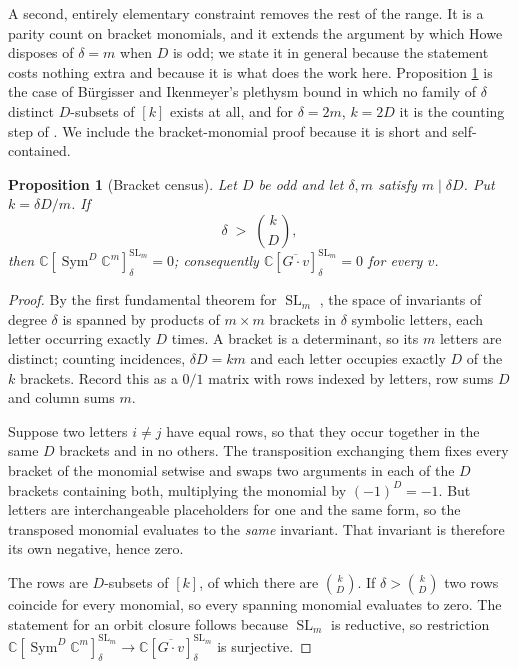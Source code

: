 \documentclass[11pt,reqno]{amsart}
\theoremstyle{plain}
\newtheorem{proposition}[theorem]{Proposition}
\theoremstyle{definition}
\DeclareMathOperator{\SL}{SL}
\DeclareMathOperator{\Sym}{Sym}
\newcommand{\bC}{\mathbb{C}}
\begin{document}
A second, entirely elementary constraint removes the rest of the range.  It is
a parity count on bracket monomials, and it extends the argument by which Howe
disposes of $\delta=m$ when $D$ is odd; we state it in general because the
statement costs nothing extra and because it is what does the work here.
Proposition \ref{prop:census} is the case of B\"urgisser and Ikenmeyer's
plethysm bound \cite[Cor.~7.2]{BI} in which no family of $\delta$ distinct
$D$-subsets of $[k]$ exists at all, and for $\delta=2m$, $k=2D$ it is the
counting step of \cite[Prop.~3.24(3)]{BI}.  We include the bracket-monomial
proof because it is short and self-contained.

\begin{proposition}[Bracket census]\label{prop:census}
Let $D$ be odd and let $\delta,m$ satisfy $m\mid \delta D$.  Put $k=\delta D/m$.
If
\[
  \delta \;>\; \binom{k}{D},
\]
then $\bC[\Sym^{D}\bC^{m}]^{\SL_m}_{\delta}=0$; consequently
$\bC[\overline{G\cdot v}]^{\SL_m}_{\delta}=0$ for every $v$.
\end{proposition}

\begin{proof}
By the first fundamental theorem for $\SL_m$ \cite{Weyl}, the space of
invariants of degree $\delta$ is spanned by products of $m\times m$ brackets in
$\delta$ symbolic letters, each letter occurring exactly $D$ times.  A bracket
is a determinant, so its $m$ letters are distinct; counting incidences,
$\delta D=km$ and each letter occupies exactly $D$ of the $k$ brackets.  Record
this as a $0/1$ matrix with rows indexed by letters, row sums $D$ and column
sums $m$.

Suppose two letters $i\ne j$ have equal rows, so that they occur together in
the same $D$ brackets and in no others.  The transposition exchanging them
fixes every bracket of the monomial setwise and swaps two arguments in each of
the $D$ brackets containing both, multiplying the monomial by $(-1)^{D}=-1$.
But letters are interchangeable placeholders for one and the same form, so the
transposed monomial evaluates to the \emph{same} invariant.  That invariant is
therefore its own negative, hence zero.

The rows are $D$-subsets of $[k]$, of which there are $\binom{k}{D}$.  If
$\delta>\binom{k}{D}$ two rows coincide for every monomial, so every spanning
monomial evaluates to zero.  The statement for an orbit closure follows because
$\SL_m$ is reductive, so restriction
$\bC[\Sym^{D}\bC^{m}]^{\SL_m}_\delta\to\bC[\overline{G\cdot v}]^{\SL_m}_\delta$
is surjective.
\end{proof}
\end{document}
